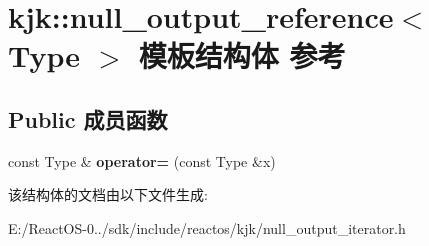 \hypertarget{structkjk_1_1null__output__reference}{}\section{kjk\+:\+:null\+\_\+output\+\_\+reference$<$ Type $>$ 模板结构体 参考}
\label{structkjk_1_1null__output__reference}
\subsection*{Public 成员函数}
\begin{DoxyCompactItemize}
\item 
\mbox{\label{structkjk_1_1null__output__reference_ac15e5688068d7c6bd721825f2d68cbf0}} 
const Type \& {\bfseries operator=} (const Type \&x)
\end{DoxyCompactItemize}


该结构体的文档由以下文件生成\+:\begin{DoxyCompactItemize}
\item 
E\+:/\+React\+O\+S-\/0../sdk/include/reactos/kjk/null\+\_\+output\+\_\+iterator.\+h\end{DoxyCompactItemize}
